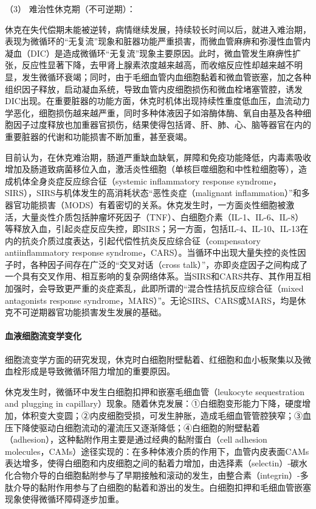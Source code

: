 \hypertarget{text00055.htmlux5cux23CHP2-1-1-2-1-1-3}{}
（3） 难治性休克期（不可逆期）：

休克在失代偿期未能被逆转，病情继续发展，持续较长时间以后，就进入难治期，表现为微循环的“无复流”现象和脏器功能严重损害，而微血管麻痹和弥漫性血管内凝血（DIC）是造成微循环“无复流”现象主要原因。此时，微血管发生麻痹性扩张，反应性显著下降，去甲肾上腺素浓度越来越高，而收缩反应性却越来越不明显，发生微循环衰竭；同时，由于毛细血管内血细胞黏着和微血管嵌塞，加之各种组织因子释放，启动凝血系统，导致血管内皮细胞损伤和微血栓堵塞管腔，诱发DIC出现。在重要脏器的功能方面，休克时机体出现持续性重度低血压，血流动力学恶化，细胞损伤越来越严重，同时多种体液因子如溶酶体酶、氧自由基及各种细胞因子过度释放也加重器官损伤，结果使得包括肾、肝、肺、心、脑等器官在内的重要脏器的代谢和功能损害不断加重，甚至衰竭。

目前认为，在休克难治期，肠道严重缺血缺氧，屏障和免疫功能降低，内毒素吸收增加及肠道致病菌移位入血，激活炎性细胞（单核巨噬细胞和中性粒细胞等），造成机体全身炎症反应综合征（systemic
inflammatory response
syndrome，SIRS），SIRS与机体发生的高消耗状态“恶性炎症（malignant
inflammation）”和多器官功能损害（MODS）有着密切的关系。休克发生时，一方面炎性细胞被激活，大量炎性介质包括肿瘤坏死因子（TNF）、白细胞介素（IL-1、IL-6、IL-8）等释放入血，引起炎症反应失控，即SIRS；另一方面，包括IL-4、IL-10、IL-13在内的抗炎介质过度表达，引起代偿性抗炎反应综合征（compensatory
antiinflammatory response
syndrome，CARS）。当循环中出现大量失控的炎性因子时，各种因子间存在广泛的“交叉对话（cross
talk）”，亦即炎症因子之间构成了一个具有交叉作用、相互影响的复杂网络体系。当SIRS和CARS共存、其作用互相加强时，会导致更严重的炎症紊乱，此即所谓的“混合性拮抗反应综合征（mixed
antagonists response
syndrome，MARS）”。无论SIRS、CARS或MARS，均是休克不可逆期器官功能损害发生发展的基础。

\paragraph{血液细胞流变学变化}

细胞流变学方面的研究发现，休克时白细胞附壁黏着、红细胞和血小板聚集以及微血栓形成是导致微循环阻力增加的重要原因。

休克发生时，微循环中发生白细胞扣押和嵌塞毛细血管（leukocyte
sequestration and plugging in
capillary）现象。随着休克发展：①白细胞变形能力下降，硬度增加，体积变大变圆；②内皮细胞受损，可发生肿胀，造成毛细血管管腔狭窄；③血压下降使驱动白细胞流动的灌流压又逐渐降低；④白细胞的附壁黏着（adhesion），这种黏附作用主要是通过经典的黏附蛋白（cell
adhesion
molecules，CAMs）途径实现的：在多种体液介质的作用下，血管内皮表面CAMs表达增多，使得白细胞和内皮细胞之间的黏着力增加，由选择素（selectin）-碳水化合物介导的白细胞黏附参与了早期接触和滚动的发生，由整合素（integrin）-多肽介导的黏附作用参与了白细胞的黏着和游出的发生。白细胞扣押和毛细血管嵌塞现象使得微循环障碍逐步加重。

